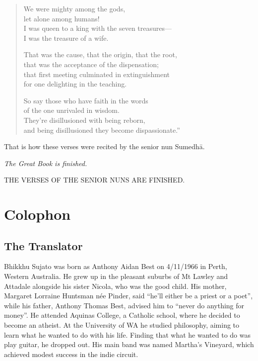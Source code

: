 \documentclass[12pt,openany]{book}%
\newcommand*{\scendsection}[1]{\begin{center}\textit{#1}\end{center}}
\newcommand*{\scendbook}[1]{\begin{center}\uppercase{#1}\end{center}}
\let\oldbackmatter\backmatter
\renewcommand{\backmatter}{%
\chapterfont{\setstretch{.85}\normalfont\centering}%
\sectionfont{\setstretch{.85}\Semiboldsubheadfont}%
\oldbackmatter}
\begin{document}
\begin{verse}
We were mighty among the gods, \\
let alone among humans! \\
I was queen to a king with the seven treasures—\\
I was the treasure of a wife. 

That was the cause, that the origin, that the root, \\
that was the acceptance of the dispensation; \\
that first meeting culminated in extinguishment \\
for one delighting in the teaching. 

So say those who have faith in the words \\
of the one unrivaled in wisdom. \\
They’re disillusioned with being reborn, \\
and being disillusioned they become dispassionate.” 

%
\end{verse}

That is how these verses were recited by the senior nun \textsanskrit{Sumedhā}. 

\scendsection{The Great Book is finished. }

\scendbook{The Verses of the Senior Nuns are finished. }

%
\backmatter%
\chapter*{Colophon}

\section*{The Translator}

Bhikkhu Sujato was born as Anthony Aidan Best on 4/11/1966 in Perth, Western Australia. He grew up in the pleasant suburbs of Mt Lawley and Attadale alongside his sister Nicola, who was the good child. His mother, Margaret Lorraine Huntsman née Pinder, said “he’ll either be a priest or a poet”, while his father, Anthony Thomas Best, advised him to “never do anything for money”. He attended Aquinas College, a Catholic school, where he decided to become an atheist. At the University of WA he studied philosophy, aiming to learn what he wanted to do with his life. Finding that what he wanted to do was play guitar, he dropped out. His main band was named Martha’s Vineyard, which achieved modest success in the indie circuit. 
\end{document}
